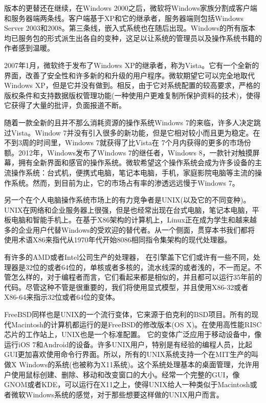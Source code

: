 	版本的更替还在继续，在Windows 2000之后，微软将Windows家族分割成客户端和服务器端两条线。客户端基于XP和它的继承者，服务器端则包括Windows Server 2003和2008。第三条线，嵌入式系统也在随后出现。Windows的所有版本均已服务包的形式派生出各自的变种，这足以让系统的管理员以及操作系统书籍的作者感到温暖。
	
	2007年1月，微软终于发布了Windows XP的继承者，称为Vista。它有一个全新的界面，改善了安全性和许多新的和升级的用户程序。微软期望它可以完全地取代Windows XP，但是它并没有做到。相反，由于它对系统配置的较高要求，严格的版权条件和支持数据版权管理功能(一种使用户更难复制所保护资料的技术)，使得它获得了大量的批评，负面报道不断。
	
	随着一款全新的且并不那么消耗资源的操作系统Windows 7的来临，许多人决定跳过Vista。Window 7并没有引入很多的新功能，但是它相对较小而且更为稳定。在不到3周的时间里，Windows 7就获得了比Vista在
	7个月内获得的更多的市场份额。2012年，Windows发布了Windows 7的继任者，Windows 8，一款针对触摸屏幕，拥有全新界面和感官的操作系统。微软希望这个操作系统会成为许多设备的主流操作系统：台式机，便携式电脑，笔记本电脑，手机，家庭影院电脑等主流的操作系统。然而，到目前为止，它的市场占有率的渗透远远慢于Windows 7。
	
	另一个在个人电脑操作系统市场上的有力竞争者是UNIX(以及它的不同变种)。UNIX在网络和企业服务器上很强，但是也经常出现在台式电脑，笔记本电脑，平板电脑和智能手机上。在基于X86架构的计算机上，Linux正在成为学生和越来越多的企业用户代替Windows的受欢迎的替代者。从一个侧面，贯穿本书我们都将使用术语X86来指代从1970年代开始8086相同指令集架构的现代处理器。
	
	有许多的AMD或者Intel公司生产的处理器，	在引擎盖下它们或许有一些不同，处理器是32位的或者64位的，单核或者多核的，流水线深的或者浅的，不一而足。不管怎么样的，对于编程者而言，它们看起来都是相似的，并且都可以运行35年前的代码。尽管这种不管是很重要的，我们将使用显式模型，并且使用X86-32或者X86-64来指示32位或者64位的变体。
	
	FreeBSD同样也是UNIX的一个流行变体，它来源于伯克利的BSD项目。所有的现代Macintosh的计算机都运行的是FreeBSD的修改版本(OS X)。在使用高性能RISC芯片的工作站上，UNIX也是一个标准配置。
	它的变体广泛应用于移动设备中，像运行iOS 7和Android的设备。许多UNIX用户，特别是有经验的编程人员，比起GUI更加喜欢使用命令行界面。所以，所有的UNIX系统支持一个在MIT生产的叫做X Windows的系统(也被称为X11系统)。这个系统处理基本的桌面管理，允许用户使用鼠标创建、删除、移动和改变窗口的大小。经常一个完整的GUI，像GNOM或者KDE，可以运行在X11之上，使得UNIX给人一种类似于Macintosh或者微软Windows系统的感觉，对于那些想要这样做的UNIX用户而言。
	
